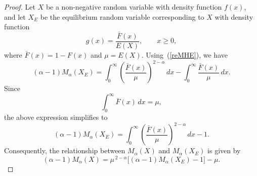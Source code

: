 \documentclass[11pt,reqno]{amsart}
\theoremstyle{tight}
\newtheorem{property}{Property}[section]
\begin{document}
\begin{proof}
 Let $X$ be a non-negative random variable with density function $f(x)$, and let $X_E$ be the equilibrium random variable corresponding to $X$ with density function
\[
g(x)=\frac{\bar{F}(x)}{E(X)}, \qquad x \ge 0,
\]
where $\bar{F}(x)=1-F(x)$ and $\mu=E(X)$.
Using~(\ref{reMHE}), we have
\[
(\alpha-1) M_{\alpha}(X_E)
= \int_{0}^{\infty}
\left( \frac{\bar{F}(x)}{\mu} \right)^{2-\alpha} \, dx
- \int_{0}^{\infty}
\frac{\bar{F}(x)}{\mu} \, dx .
\]
Since
\[
\int_{0}^{\infty} \bar{F}(x)\,dx=\mu,
\]
the above expression simplifies to
\[
(\alpha-1) M_{\alpha}(X_E)
= \int_{0}^{\infty}
\left( \frac{\bar{F}(x)}{\mu} \right)^{2-\alpha} \, dx - 1.
\]
Consequently, the relationship between $M_{\alpha}(X)$ and $M_{\alpha}(X_E)$ is given by
\[
(\alpha-1) M_{\alpha}(X)
= \mu^{\,2-\alpha}
\bigl[(\alpha-1) M_{\alpha}(X_E) - 1\bigr]
- \mu .
\]



\end{proof}

\end{document}
